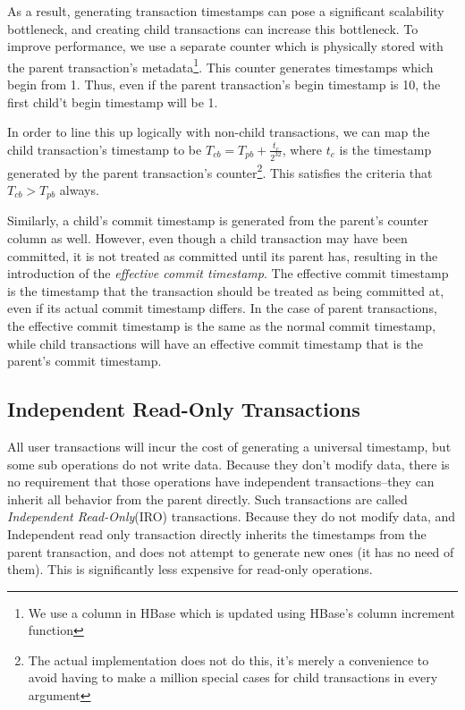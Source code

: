 As a result, generating transaction timestamps can pose a significant scalability bottleneck, and creating child transactions can increase this bottleneck. To improve performance, we use a separate counter which is physically stored with the parent transaction's metadata\footnote{We use a column in HBase which is updated using HBase's column increment function}. This counter generates timestamps which begin from 1. Thus, even if the parent transaction's begin timestamp is 10, the first child't begin timestamp will be 1.

In order to line this up logically with non-child transactions, we can map the child transaction's timestamp to be $T_{cb} = T_{pb} + \frac{t_c}{2^{32}}$, where $t_c$ is the timestamp generated by the parent transaction's counter\footnote{The actual implementation does not do this, it's merely a convenience to avoid having to make a million special cases for child transactions in every argument}. This satisfies the criteria that $T_{cb} > T_{pb}$ always.

Similarly, a child's commit timestamp is generated from the parent's counter column as well. However, even though a child transaction may have been committed, it is not treated as committed until its parent has, resulting in the introduction of the \emph{effective commit timestamp}. The effective commit timestamp is the timestamp that the transaction should be treated as being committed at, even if its actual commit timestamp differs. In the case of parent transactions, the effective commit timestamp is the same as the normal commit timestamp, while child transactions will have an effective commit timestamp that is the parent's commit timestamp. 

\subsection{Independent Read-Only Transactions}
All user transactions will incur the cost of generating a universal timestamp, but some sub operations do not write data. Because they don't modify data, there is no requirement that those operations have independent transactions--they can inherit all behavior from the parent directly. Such transactions are called \emph{Independent Read-Only}(IRO) transactions. Because they do not modify data, and Independent read only transaction directly inherits the timestamps from the parent transaction, and does not attempt to generate new ones (it has no need of them). This is significantly less expensive for read-only operations.


